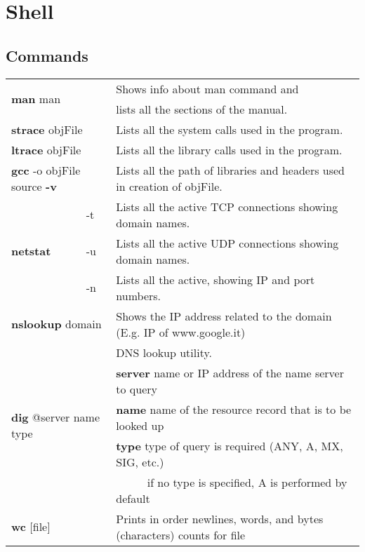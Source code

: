 \chapter{Shell}

\section{Commands}

\begin{table}[h]
\centering
\footnotesize
\begin{tabular}{|l|l|l|}
\hline
\multicolumn{2}{|l|}{\multirow{2}{*}{\textbf{man} man}}&{Shows info about man command and}\\
\multicolumn{2}{|l|}{} & {lists all the sections of the manual.}\\
\hline
\multicolumn{2}{|l|}{\textbf{strace} objFile} & {Lists all the system calls used in the program.}\\
\hline
\multicolumn{2}{|l|}{\textbf{ltrace} objFile} & {Lists all the library calls used in the program.}\\
\multicolumn{2}{|l|}{\textbf{gcc} -o objFile source \textbf{-v}} & {Lists all the path of libraries and headers used in creation of objFile.}\\
\hline
\multirow{3}{*}{\textbf{netstat}} & {-t} & {Lists all the active TCP connections showing domain names.}\\
\cline{2-3}
& {-u} & {Lists all the active UDP connections showing domain names.}\\
\cline{2-3}
& {-n} & {Lists all the active, showing IP and port numbers.}\\
\hline
\multicolumn{2}{|l|}{\textbf{nslookup} domain} & {Shows the IP address related to the domain (E.g. IP of www.google.it)}\\
\hline
\multicolumn{2}{|l|}{\multirow{5}{*}{\textbf{dig} @server name type}}&{DNS lookup utility.}\\
\multicolumn{2}{|l|}{}&{\textbf{server} name or IP address of the name server to query}\\
\multicolumn{2}{|l|}{}&{\textbf{name} name of the resource record that is to be looked up}\\
\multicolumn{2}{|l|}{}&{\textbf{type} type of query is required (ANY, A, MX, SIG, etc.)}\\
\multicolumn{2}{|l|}{}&{$\;\;\;\;\;\;\;\;\;\;$if no type is specified, A is performed by default}\\
\hline
\multicolumn{2}{|l|}{\multirow{2}{*}{\textbf{wc} [file]}} & {Prints in order newlines, words, and bytes (characters) counts for file}\\

\end{tabular}
\end{table}
